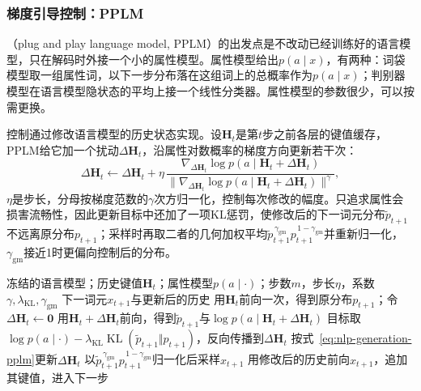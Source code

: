 \subsubsection{梯度引导控制：PPLM}
\label{sec:nlp-generation-pplm}

（plug and play language model, PPLM）的出发点是不改动已经训练好的语言模型，只在解码时外接一个小的属性模型。属性模型给出$p(a\mid x)$，有两种：词袋模型取一组属性词，以下一步分布落在这组词上的总概率作为$p(a\mid x)$；判别器模型在语言模型隐状态的平均上接一个线性分类器。属性模型的参数很少，可以按需更换。

控制通过修改语言模型的历史状态实现。设$\bm H_t$是第$t$步之前各层的键值缓存，PPLM给它加一个扰动$\Delta\bm H_t$，沿属性对数概率的梯度方向更新若干次：
\begin{equation}
  \Delta\bm H_t\leftarrow\Delta\bm H_t+\eta\,
  \frac{\nabla_{\Delta\bm H_t}\log p(a\mid\bm H_t+\Delta\bm H_t)}
  {\bigl\lVert\nabla_{\Delta\bm H_t}\log p(a\mid\bm H_t+\Delta\bm H_t)\bigr\rVert^{\gamma}},
  \label{eq:nlp-generation-pplm}
\end{equation}
$\eta$是步长，分母按梯度范数的$\gamma$次方归一化，控制每次修改的幅度。只追求属性会损害流畅性，因此更新目标中还加了一项KL惩罚，使修改后的下一词元分布$\widetilde p_{t+1}$不远离原分布$p_{t+1}$；采样时再取二者的几何加权平均$\widetilde p_{t+1}^{\,\gamma_{\mathrm{gm}}}p_{t+1}^{\,1-\gamma_{\mathrm{gm}}}$并重新归一化，$\gamma_{\mathrm{gm}}$接近1时更偏向控制后的分布。

\begin{algorithm}[PPLM的单步生成]
  \label{alg:nlp-generation-pplm}
  \begin{algorithmic}[1]
    \Require 冻结的语言模型；历史键值$\bm H_t$；属性模型$p(a\mid\cdot)$；步数$m$，步长$\eta$，系数$\gamma,\lambda_{\mathrm{KL}},\gamma_{\mathrm{gm}}$
    \Ensure 下一词元$x_{t+1}$与更新后的历史
    \State 用$\bm H_t$前向一次，得到原分布$p_{t+1}$；令$\Delta\bm H_t\gets\bm 0$
      \State 用$\bm H_t+\Delta\bm H_t$前向，得到$\widetilde p_{t+1}$与$\log p(a\mid\bm H_t+\Delta\bm H_t)$
      \State 目标取$\log p(a\mid\cdot)-\lambda_{\mathrm{KL}}\operatorname{KL}(\widetilde p_{t+1}\Vert p_{t+1})$，反向传播到$\Delta\bm H_t$
      \State 按式~\eqref{eq:nlp-generation-pplm}更新$\Delta\bm H_t$
    \EndFor
    \State 以$\widetilde p_{t+1}^{\,\gamma_{\mathrm{gm}}}p_{t+1}^{\,1-\gamma_{\mathrm{gm}}}$归一化后采样$x_{t+1}$
    \State 用修改后的历史前向$x_{t+1}$，追加其键值，进入下一步
  \end{algorithmic}
\end{algorithm}

